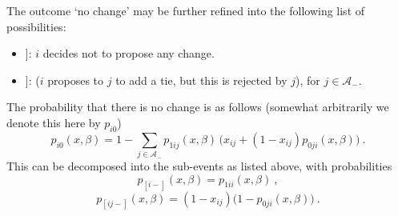 \documentclass[a4paper,12pt,fleqn]{article}
\begin{document}
The outcome `no change' may be further refined into the following list
of possibilities:
\begin{itemize}
\item[[$i-\!\!\!$]]: $i$ decides not to propose any change.
\item[[$ij-\!\!\!$]]: ($i$ proposes to $j$ to add a tie, but this is rejected by $j$), for $j \in \mathcal A_-$.
\end{itemize}

The probability that there is no change is as follows
(somewhat arbitrarily we denote this here by $p_{i0}$)
\begin{equation}
  p_{i0}(x, \beta) =
  1 - \sum_{j \in \mathcal A_-}   p_{1ij}(x, \beta)\, \big(x_{ij} + (1-x_{ij})p_{0ji}(x, \beta) \big)\ .
\end{equation}
This can be decomposed into the sub-events as listed above, with probabilities
\begin{equation}
  p_{[i-]}(x, \beta) = p_{1ii}(x, \beta) \ ,
\end{equation}
\begin{equation}
  p_{[ij-]}(x, \beta) = (1-x_{ij})\big(1-p_{0ji}(x, \beta) \big)\ .
\end{equation}
\end{document}
